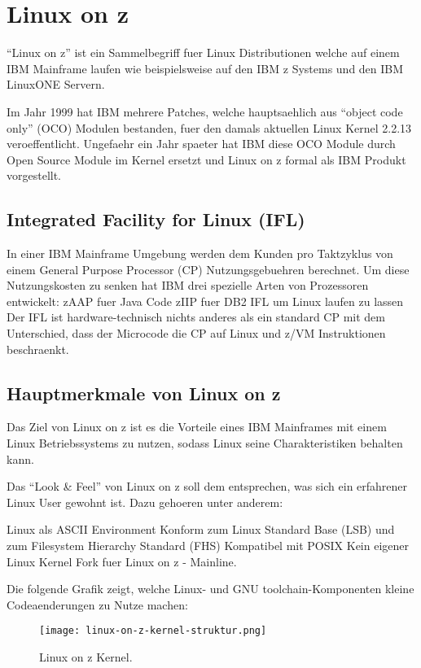 \chapter{Linux on z}
\label{cha:Linux_on_z}

“Linux on z” ist ein Sammelbegriff fuer Linux Distributionen welche auf einem IBM Mainframe laufen wie beispielsweise auf den IBM z Systems und den IBM LinuxONE Servern.

Im Jahr 1999 hat IBM mehrere Patches, welche hauptsaehlich aus “object code only” (OCO) Modulen bestanden, fuer den damals aktuellen Linux Kernel 2.2.13 veroeffentlicht.
Ungefaehr ein Jahr spaeter hat IBM diese OCO Module durch Open Source Module im Kernel ersetzt und Linux on z formal als IBM Produkt vorgestellt.

\section{Integrated Facility for Linux (IFL)}

In einer IBM Mainframe Umgebung werden dem Kunden pro Taktzyklus von einem General Purpose Processor (CP) Nutzungsgebuehren berechnet. Um diese Nutzungskosten zu senken hat IBM drei spezielle Arten von Prozessoren entwickelt:
zAAP fuer Java Code
zIIP fuer DB2
IFL um Linux laufen zu lassen
Der IFL ist hardware-technisch nichts anderes als ein standard CP mit dem Unterschied, dass der Microcode die CP auf Linux und z/VM Instruktionen beschraenkt.

\section{Hauptmerkmale von Linux on z}

Das Ziel von Linux on z ist es die Vorteile eines IBM Mainframes mit einem Linux Betriebssystems zu nutzen, sodass Linux seine Charakteristiken behalten kann.

Das “Look \& Feel” von Linux on z soll dem entsprechen, was sich ein erfahrener Linux User gewohnt ist. Dazu gehoeren unter anderem:

Linux als ASCII Environment
Konform zum Linux Standard Base (LSB) und zum Filesystem Hierarchy Standard (FHS)
Kompatibel mit POSIX
Kein eigener Linux Kernel Fork fuer Linux on z - Mainline.

Die folgende Grafik zeigt, welche Linux- und GNU toolchain-Komponenten kleine Codeaenderungen zu Nutze machen:

\begin{figure}[h!]
\centering
\texttt{[image: linux-on-z-kernel-struktur.png]}
\caption{Linux on z Kernel\cite{LinuxOnZKernel}.}
\label{fig:LinuxOnZKernel}
\end{figure}

